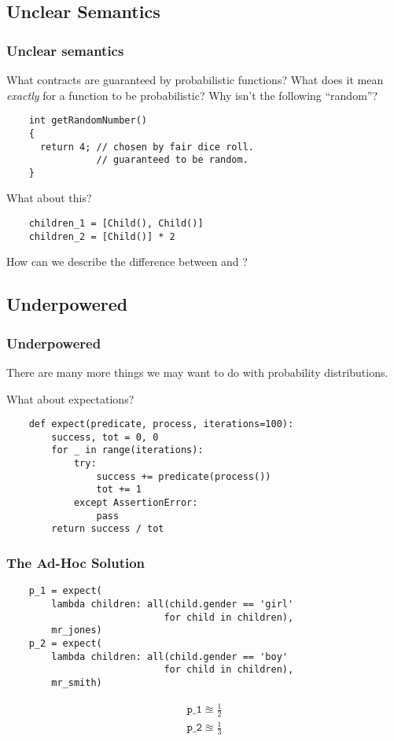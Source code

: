 \documentclass[usenames,dvipsnames]{beamer}
\begin{document}
\subsection{Unclear Semantics}
\begin{frame}[fragile]
  \frametitle{Unclear semantics}
  What contracts are guaranteed by probabilistic functions? What does it mean
  \emph{exactly} for a function to be probabilistic? Why isn't the
  following ``random''?
  \begin{verbatim}
    int getRandomNumber()
    {
      return 4; // chosen by fair dice roll.
                // guaranteed to be random.
    }
  \end{verbatim} 
\end{frame}
\begin{frame}[fragile]
  What about this?
  \begin{verbatim}
    children_1 = [Child(), Child()]
    children_2 = [Child()] * 2
  \end{verbatim}
  How can we describe the difference between  and
  ?
\end{frame}
\subsection{Underpowered}
\begin{frame}[fragile]
  \frametitle{Underpowered}
  There are many more things we may want to do with probability distributions.

  What about expectations?
  \begin{verbatim}
    def expect(predicate, process, iterations=100):
        success, tot = 0, 0
        for _ in range(iterations):
            try:
                success += predicate(process())
                tot += 1
            except AssertionError:
                pass
        return success / tot
  \end{verbatim}
\end{frame}
\begin{frame}[fragile]
  \frametitle{The Ad-Hoc Solution}
  \begin{verbatim}
    p_1 = expect(
        lambda children: all(child.gender == 'girl'
                            for child in children),
        mr_jones)
    p_2 = expect(
        lambda children: all(child.gender == 'boy'
                            for child in children),
        mr_smith)
  \end{verbatim}
  \begin{gather*}
    \texttt{p_1} \approxeq \frac{1}{2} \\
    \texttt{p_2} \approxeq \frac{1}{3}
  \end{gather*}
\end{frame}
\end{document}
